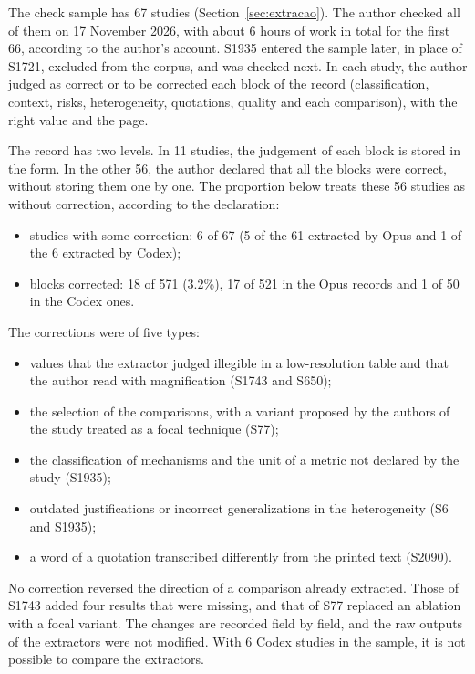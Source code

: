 The check sample has 67 studies (Section~\ref{sec:extracao}). The author checked all of them on 17 November 2026, with
about 6 hours of work in total for the first 66, according to the author's account. S1935 entered the sample later, in
place of S1721, excluded from the corpus, and was checked next. In each study, the author judged as correct or to be
corrected each block of the record (classification, context, risks, heterogeneity, quotations, quality and each
comparison), with the right value and the page.

The record has two levels. In 11 studies, the judgement of each block is stored in the form. In the other 56, the
author declared that all the blocks were correct, without storing them one by one. The proportion below treats these 56
studies as without correction, according to the declaration:
\begin{itemize}
  \item studies with some correction: 6 of 67 (5 of the 61 extracted by Opus and 1 of the 6 extracted by Codex);
  \item blocks corrected: 18 of 571 (3.2\%), 17 of 521 in the Opus records and 1 of 50 in the Codex ones.
\end{itemize}

The corrections were of five types:
\begin{itemize}
  \item values that the extractor judged illegible in a low-resolution table and that the author read with magnification
  (S1743 and S650);
  \item the selection of the comparisons, with a variant proposed by the authors of the study treated as a focal technique (S77);
  \item the classification of mechanisms and the unit of a metric not declared by the study (S1935);
  \item outdated justifications or incorrect generalizations in the heterogeneity (S6 and S1935);
  \item a word of a quotation transcribed differently from the printed text (S2090).
\end{itemize}
No correction reversed the direction of a comparison already extracted. Those of S1743 added four results that
were missing, and that of S77 replaced an ablation with a focal variant. The changes are recorded field by
field, and the raw outputs of the extractors were not modified. With 6 Codex studies in the sample, it is not possible
to compare the extractors.

